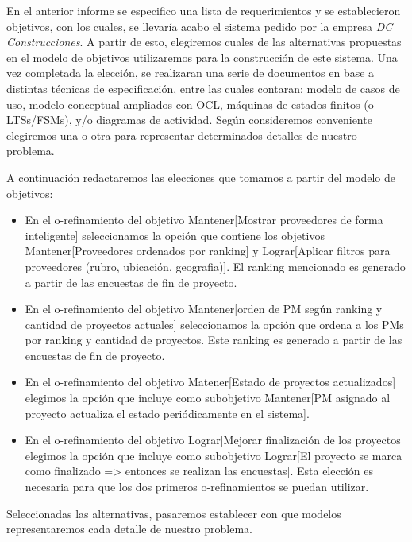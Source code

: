 En el anterior informe se especifico una lista de requerimientos y se establecieron objetivos, con los cuales,
se llevaría acabo el sistema pedido por la empresa \textit{DC Construcciones}. A partir de esto,
elegiremos cuales de las alternativas propuestas en el modelo de objetivos utilizaremos para la
construcción de este sistema. Una vez completada la elección, se realizaran una serie de documentos
en base a distintas técnicas de especificación, entre las cuales contaran: modelo de casos de uso,
modelo conceptual ampliados con OCL, máquinas de estados finitos (o LTSs/FSMs), y/o diagramas
de actividad. Según consideremos conveniente elegiremos una o otra para representar determinados
detalles de nuestro problema.

A continuación redactaremos las elecciones que tomamos a partir del modelo de objetivos:

\begin{itemize}
\item En el o-refinamiento del objetivo Mantener[Mostrar proveedores de forma inteligente] seleccionamos la opción que contiene los objetivos Mantener[Proveedores ordenados por ranking] y Lograr[Aplicar filtros para proveedores (rubro, ubicación, geografia)]. El ranking mencionado es generado a partir de las encuestas de fin de proyecto.
\item En el o-refinamiento del objetivo Mantener[orden de PM según ranking y cantidad de proyectos actuales] seleccionamos la opción que ordena a los PMs por ranking y cantidad de proyectos. Este ranking es generado a partir de las encuestas de fin de proyecto.
\item En el o-refinamiento del objetivo Matener[Estado de proyectos actualizados] elegimos la opción que incluye como subobjetivo Mantener[PM asignado al proyecto
actualiza el estado periódicamente en el sistema].
\item En el o-refinamiento del objetivo Lograr[Mejorar finalización de los proyectos] elegimos la opción que incluye como subobjetivo Lograr[El proyecto se marca como finalizado => entonces se realizan las encuestas]. Esta elección es necesaria para que los dos primeros o-refinamientos se puedan utilizar.
\end{itemize}

Seleccionadas las alternativas, pasaremos establecer con que modelos representaremos cada detalle de nuestro problema.

